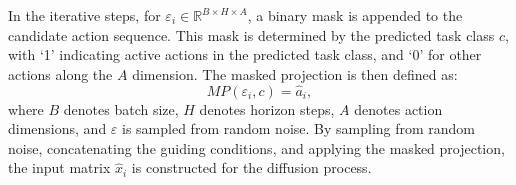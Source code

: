 In the iterative steps, for \( \varepsilon_i \in \mathbb{R}^{B \times H \times A} \), a binary mask is appended to the candidate action sequence. This mask is determined by the predicted task class \( c \), with `1' indicating active actions in the predicted task class, and `0' for other actions along the \( A \) dimension. The masked projection is then defined as:
\begin{equation}
    MP(\varepsilon_i, c) = \hat{a}_i,
\end{equation}
where \( B \) denotes batch size, \( H \) denotes horizon steps, \( A \) denotes action dimensions, and \( \varepsilon \) is sampled from random noise. By sampling from random noise, concatenating the guiding conditions, and applying the masked projection, the input matrix \( \hat{x}_i \) is constructed for the diffusion process.

